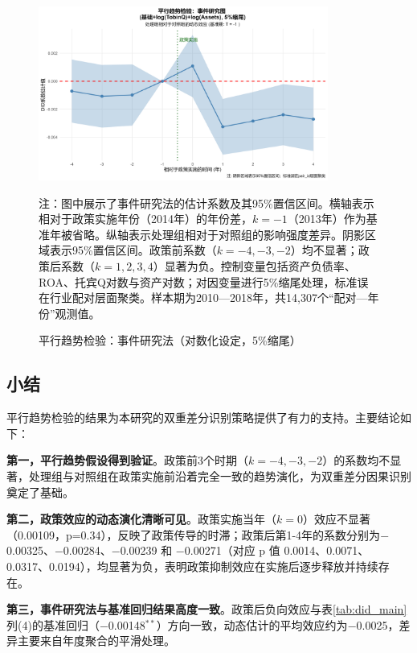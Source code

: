 \begin{figure}[htbp]
\centering
\includegraphics[width=0.85\textwidth]{figures/PT_logQA_0pct5.png}
\caption{平行趋势检验：事件研究法（对数化设定，5\%缩尾）}
\label{fig:parallel_trends}
\begin{minipage}{0.9\textwidth}
\footnotesize
注：图中展示了事件研究法的估计系数及其95\%置信区间。横轴表示相对于政策实施年份（2014年）的年份差，$k=-1$（2013年）作为基准年被省略。纵轴表示处理组相对于对照组的影响强度差异。阴影区域表示95\%置信区间。政策前系数（$k=-4,-3,-2$）均不显著；政策后系数（$k=1,2,3,4$）显著为负。控制变量包括资产负债率、ROA、托宾Q对数与资产对数；对因变量进行5\%缩尾处理，标准误在行业配对层面聚类。样本期为2010—2018年，共14,307个“配对—年份”观测值。
\end{minipage}
\end{figure}

\subsection{小结}

平行趋势检验的结果为本研究的双重差分识别策略提供了有力的支持。主要结论如下：

\textbf{第一，平行趋势假设得到验证}。政策前3个时期（$k=-4,-3,-2$）的系数均不显著，处理组与对照组在政策实施前沿着完全一致的趋势演化，为双重差分因果识别奠定了基础。

\textbf{第二，政策效应的动态演化清晰可见}。政策实施当年（$k=0$）效应不显著（0.00109，p=0.34），反映了政策传导的时滞；政策后第1-4年的系数分别为$-$0.00325、$-$0.00284、$-$0.00239 和 $-$0.00271（对应 p 值 0.0014、0.0071、0.0317、0.0194），均显著为负，表明政策抑制效应在实施后逐步释放并持续存在。

\textbf{第三，事件研究法与基准回归结果高度一致}。政策后负向效应与表\ref{tab:did_main}列(4)的基准回归（$-$0.00148$^{**}$）方向一致，动态估计的平均效应约为$-$0.0025，差异主要来自年度聚合的平滑处理。

